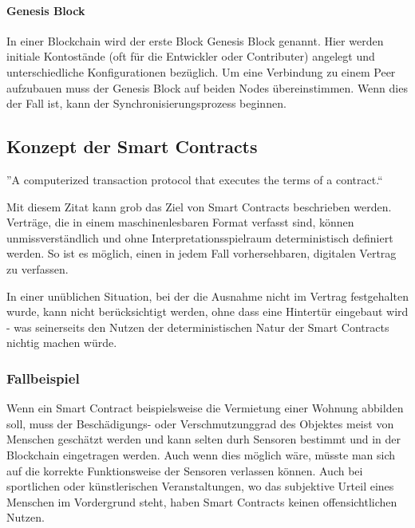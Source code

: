 \paragraph{Genesis Block}
In einer Blockchain wird der erste Block Genesis Block genannt. Hier werden initiale Kontostände (oft für die Entwickler oder Contributer) angelegt und unterschiedliche Konfigurationen bezüglich.
Um eine Verbindung zu einem Peer aufzubauen muss der Genesis Block auf beiden Nodes übereinstimmen. Wenn dies der Fall ist, kann der Synchronisierungsprozess beginnen.

\subsection{Konzept der Smart Contracts}
\label{subsec:Recherche_Smart_Contracts}
''A computerized transaction protocol that executes the terms of a contract.``\cite{BlockchainRevolution}

Mit diesem Zitat kann grob das Ziel von Smart Contracts beschrieben werden. Verträge, die in einem maschinenlesbaren Format verfasst sind, können unmissverständlich und ohne Interpretationsspielraum deterministisch definiert werden. So ist es möglich, einen in jedem Fall vorhersehbaren, digitalen Vertrag zu verfassen.

In einer unüblichen Situation, bei der die Ausnahme nicht im Vertrag festgehalten wurde, kann nicht berücksichtigt werden, ohne dass eine Hintertür eingebaut wird - was seinerseits den Nutzen der deterministischen Natur der Smart Contracts nichtig machen würde.

\subsubsection{Fallbeispiel}
Wenn ein Smart Contract beispielsweise die Vermietung einer Wohnung abbilden soll, muss der Beschädigungs- oder Verschmutzunggrad des Objektes meist von Menschen geschätzt werden und kann selten durh Sensoren bestimmt und in der Blockchain eingetragen werden. Auch wenn dies möglich wäre, müsste man sich auf die korrekte Funktionsweise der Sensoren verlassen können. Auch bei sportlichen oder künstlerischen Veranstaltungen, wo das subjektive Urteil eines Menschen im Vordergrund steht, haben Smart Contracts keinen offensichtlichen Nutzen.\cite{ibtimes.co.uk/abiguity}

